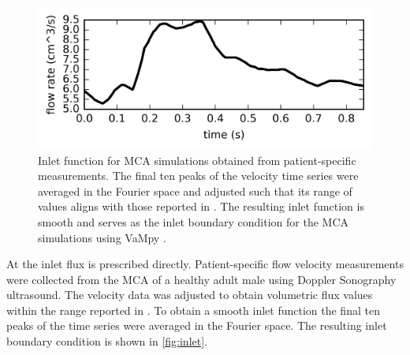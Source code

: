 \documentclass[a4paper,titlepage]{scrartcl}
\begin{document}
\begin{figure}
\centerline{\includegraphics{figures/inlet.png}}
\caption{Inlet function for MCA simulations obtained from patient-specific measurements. The final ten peaks of the velocity time series were averaged in the Fourier space and adjusted such that its range of values aligns with those reported in \cite{Olufsen2002}. The resulting inlet function is smooth and serves as the inlet boundary condition for the MCA simulations using VaMpy \cite{Diem2016a}.\label{fig:inlet}}
\end{figure}

At the inlet flux is prescribed directly. Patient-specific flow velocity measurements were collected from the MCA of a healthy adult male using Doppler Sonography ultrasound. The velocity data was adjusted to obtain volumetric flux values within the range reported in \cite{Olufsen2002}. To obtain a smooth inlet function the final ten peaks of the time series were averaged in the Fourier space. The resulting inlet boundary condition is shown in \autoref{fig:inlet}.
\end{document}

